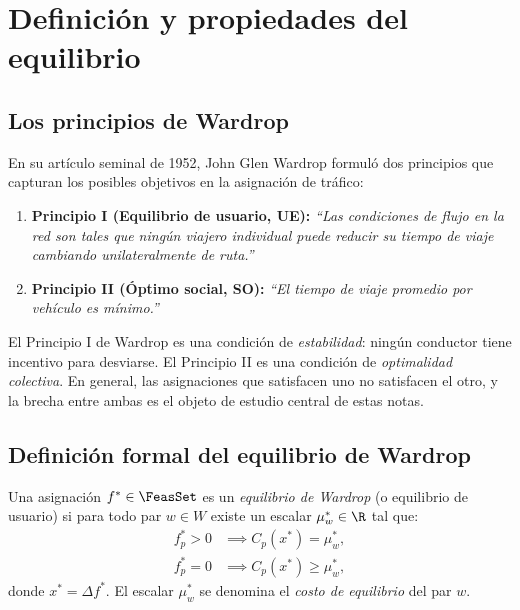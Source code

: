 
\section{Definición y propiedades del equilibrio}

\subsection{Los principios de Wardrop}


En su artículo seminal de 1952, John Glen Wardrop formuló dos principios que capturan los posibles objetivos en la asignación de tráfico:

\begin{definition}\label{def:wardrop_principles}
\begin{enumerate}
    \item \textbf{Principio I (Equilibrio de usuario, UE):} \emph{``Las condiciones de flujo en la red son tales que ningún viajero individual puede reducir su tiempo de viaje cambiando unilateralmente de ruta.''}
    \item \textbf{Principio II (Óptimo social, SO):} \emph{``El tiempo de viaje promedio por vehículo es mínimo.''}
\end{enumerate}
\end{definition}

\begin{remark}
El Principio I de Wardrop es una condición de \emph{estabilidad}: ningún conductor tiene incentivo para desviarse. El Principio II es una condición de \emph{optimalidad colectiva}. En general, las asignaciones que satisfacen uno no satisfacen el otro, y la brecha entre ambas es el objeto de estudio central de estas notas.
\end{remark}

\subsection{Definición formal del equilibrio de Wardrop}

\begin{definition}\label{def:wardrop_equilibrium}
Una asignación $f^* \in \FeasSet$ es un \emph{equilibrio de Wardrop} (o equilibrio de usuario) si para todo par $w \in W$ existe un escalar $\mu_w^* \in \R$ tal que:
\begin{align}
f_p^* > 0 &\implies C_p(x^*) = \mu_w^*, \label{eq:wardrop_used}\\
f_p^* = 0 &\implies C_p(x^*) \geq \mu_w^*, \label{eq:wardrop_unused}
\end{align}
donde $x^* = \Delta f^*$. El escalar $\mu_w^*$ se denomina el \emph{costo de equilibrio} del par $w$.
\end{definition}

